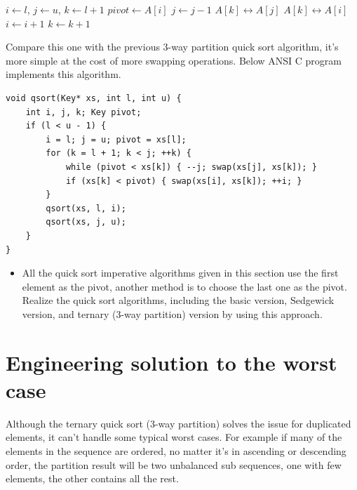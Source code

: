 \documentclass[b5paper]{article}
\begin{document}
\begin{algorithmic}[1]
    \State $i \gets l$, $j \gets u$, $k \gets l + 1$
    \State $pivot \gets A[i]$
        \State $j \gets j - 1$
        \State {} $A[k] \leftrightarrow A[j]$
      \EndWhile
        \State {} $A[k] \leftrightarrow A[i]$
        \State $i \gets i + 1$
      \EndIf
      \State $k \gets k + 1$
    \EndWhile
    \State {}
    \State {}
  \EndIf
\EndProcedure
\end{algorithmic}

Compare this one with the previous 3-way partition quick sort algorithm, it's more
simple at the cost of more swapping operations. Below ANSI C program implements this
algorithm.

\lstset{language=C}
\begin{lstlisting}
void qsort(Key* xs, int l, int u) {
    int i, j, k; Key pivot;
    if (l < u - 1) {
        i = l; j = u; pivot = xs[l];
        for (k = l + 1; k < j; ++k) {
            while (pivot < xs[k]) { --j; swap(xs[j], xs[k]); }
            if (xs[k] < pivot) { swap(xs[i], xs[k]); ++i; }
        }
        qsort(xs, l, i);
        qsort(xs, j, u);
    }
}
\end{lstlisting}

\begin{Exercise}
\begin{itemize}
\item All the quick sort imperative algorithms given in this section use the first element as the pivot,
another method is to choose the
last one as the pivot. Realize the quick sort algorithms, including the basic version, Sedgewick version, and
ternary (3-way partition) version by using this approach.
\end{itemize}
\end{Exercise}

\section{Engineering solution to the worst case}
Although the ternary quick sort (3-way partition) solves the issue for duplicated elements, it can't handle
some typical worst cases. For example if many of the elements in the sequence are ordered, no matter it's
in ascending or descending order, the partition result will be two unbalanced sub sequences, one with few elements,
the other contains all the rest.
\end{document}
